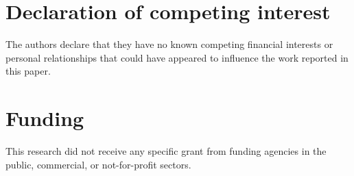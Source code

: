 \documentclass[review,12pt]{elsarticle}
\begin{document}
\section*{Declaration of competing interest}
The authors declare that they have no known competing financial interests or personal relationships that could have appeared to influence the work reported in this paper.

\section*{Funding}
This research did not receive any specific grant from funding agencies in the public, commercial, or not-for-profit sectors.



\end{document}
